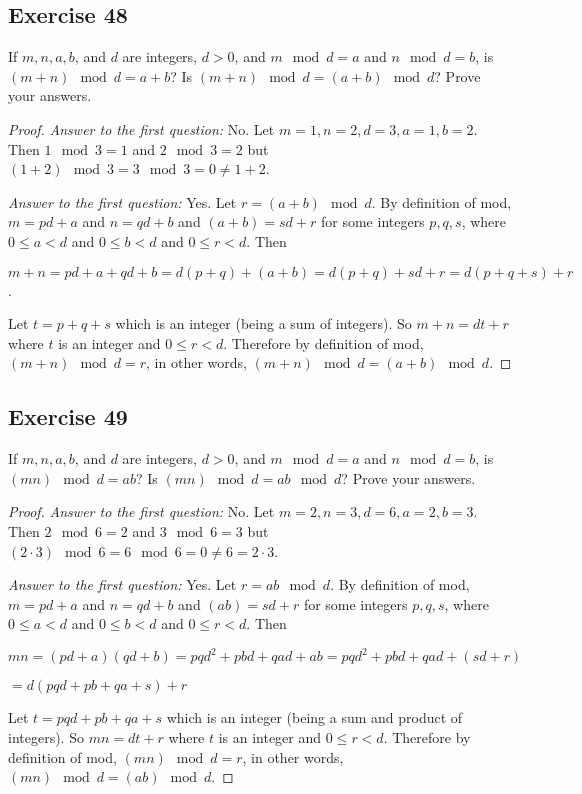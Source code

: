 \documentclass[14pt]{extarticle}
\begin{document}
\subsection{Exercise 48}
If $m, n, a, b$, and $d$ are integers, $d > 0$, and $m \mod d = a$ and $n \mod d = b$, is $(m + n) \mod d = a + b$? Is $(m + n) \mod d = (a + b) \mod d$? Prove your answers.

\begin{proof}
{\it Answer to the first question:} No. Let $m = 1, n = 2, d = 3, a = 1, b = 2$. Then $1 \mod 3 = 1$ and $2 \mod 3 = 2$ but $(1+2) \mod 3 = 3 \mod 3 = 0 \neq 1+2$.

{\it Answer to the first question:} Yes. Let $r = (a+b) \mod d$. By definition of mod, $m = pd+a$ and $n = qd+b$ and $(a+b) = sd+r$ for some integers $p,q,s$, where $0 \leq a < d$ and $0 \leq b < d$ and $0 \leq r < d$. Then 

$m+n = pd+a+qd+b = d(p+q)+(a+b) = d(p+q) + sd+r = d(p+q+s)+r$.

Let $t = p+q+s$ which is an integer (being a sum of integers). So $m+n = dt + r$ where $t$ is an integer and $0 \leq r < d$. Therefore by definition of mod, $(m+n) \mod d = r$, in other words, $(m + n) \mod d = (a + b) \mod d$.
\end{proof}

\subsection{Exercise 49}
If $m, n, a, b$, and $d$ are integers, $d > 0$, and $m \mod d = a$ and $n \mod d = b$, is $(mn) \mod d = ab$? Is $(mn) \mod d = ab \mod d$? Prove your answers.

\begin{proof}
{\it Answer to the first question:} No. Let $m = 2, n = 3, d = 6, a = 2, b = 3$. Then $2 \mod 6 = 2$ and $3 \mod 6 = 3$ but $(2\cdot3) \mod 6 = 6 \mod 6 = 0 \neq 6 = 2\cdot3$.

{\it Answer to the first question:} Yes. Let $r = ab \mod d$. By definition of mod, $m = pd+a$ and $n = qd+b$ and $(ab) = sd+r$ for some integers $p,q,s$, where $0 \leq a < d$ and $0 \leq b < d$ and $0 \leq r < d$. Then 

$mn = (pd+a)(qd+b) = pqd^2 + pbd + qad + ab = pqd^2 + pbd + qad + (sd + r)$

$ = d(pqd+pb+qa+s) + r$

Let $t = pqd+pb+qa+s$ which is an integer (being a sum and product of integers). So $mn = dt + r$ where $t$ is an integer and $0 \leq r < d$. Therefore by definition of mod, $(mn) \mod d = r$, in other words, $(mn) \mod d = (ab) \mod d$.
\end{proof}
\end{document}

